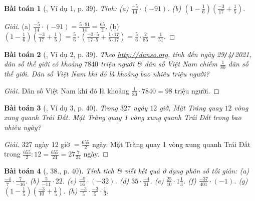 \documentclass{article}
\newtheorem{baitoan}{Bài toán}
\begin{document}
\begin{baitoan}[\cite{SBT_Toan_6_Canh_Dieu_tap_2}, Ví dụ 1, p. 39]
	Tính: (a) $\frac{-5}{14}\cdot(-91)$. (b) $\left(1 - \frac{1}{6}\right)\left(\frac{-3}{17} + \frac{1}{5}\right)$.
\end{baitoan}

\begin{proof}[Giải]
	(a) $\frac{-5}{14}\cdot(-91) = \frac{5\cdot91}{14} = \frac{65}{2}$. (b) $\left(1 - \frac{1}{6}\right)\left(\frac{-3}{17} + \frac{1}{5}\right) = \frac{5}{6}\cdot\left(\frac{-3\cdot5}{17\cdot5} + \frac{1\cdot17}{5\cdot17}\right) = \frac{5}{6}\cdot\frac{2}{85} = \frac{1}{51}$.
\end{proof}

\begin{baitoan}[\cite{SBT_Toan_6_Canh_Dieu_tap_2}, Ví dụ 2, p. 39]
	Theo \url{http://danso.org}, tính đến ngày \emph{29\texttt{/}4\texttt{/}2021}, dân số thế giới có khoảng $7840$ triệu người \& dân số Việt Nam chiếm $\frac{1}{80}$ dân số thế giới. Dân số Việt Nam khi đó là khoảng bao nhiêu triệu người?
\end{baitoan}

\begin{proof}[Giải]
	Dân số Việt Nam khi đó là khoảng $\frac{1}{80}\cdot7840 = 98$ triệu người.
\end{proof}

\begin{baitoan}[\cite{SBT_Toan_6_Canh_Dieu_tap_2}, Ví dụ 3, p. 40]
	Trong $327$ ngày $12$ giờ, Mặt Trăng quay $12$ vòng xung quanh Trái Đất. Mặt Trăng quay 1 vòng xung quanh Trái Đất trong bao nhiêu ngày?
\end{baitoan}

\begin{proof}[Giải]
	327 ngày 12 giờ $= \frac{655}{2}$ ngày. Mặt Trăng quay 1 vòng xung quanh Trái Đất trong $\frac{655}{2}:12 = \frac{655}{24} = 27\frac{7}{24}$ ngày.
\end{proof}

\begin{baitoan}[\cite{SBT_Toan_6_Canh_Dieu_tap_2}, 38., p. 40]
	Tính tích \& viết kết quả ở dạng phân số tối giản: (a) $\frac{-4}{7}\cdot\frac{7}{-16}$. (b) $\frac{5}{-11}\cdot22$. (c) $\frac{-5}{16}\cdot(-32)$. (d) $35\cdot\frac{-4}{21}$. (e) $\frac{25}{10}\cdot1\frac{1}{3}$. (f) $\frac{-37}{401}\cdot(-1)$. (g) $\left(1 - \frac{1}{5}\right)\left(\frac{-3}{10} + \frac{1}{5}\right)$. (h) $\frac{-3}{5}\cdot\frac{-3}{5}\cdot\frac{1}{3}$.
\end{baitoan}
\end{document}

